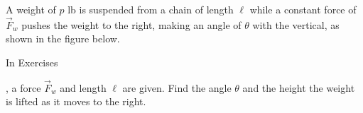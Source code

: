 {\noindent A weight of $p$ lb is suspended from a chain of length $\ell$ while a constant force of $\vec F_w$ pushes the weight to the right, making an angle of $\theta$ with the vertical, as shown in the figure below. 
\begin{center}
\end{center}
In Exercises}
{,  a force $\vec F_w$ and length $\ell$ are given. Find the angle $\theta$ and the height the weight is lifted as it moves to the right.
}
